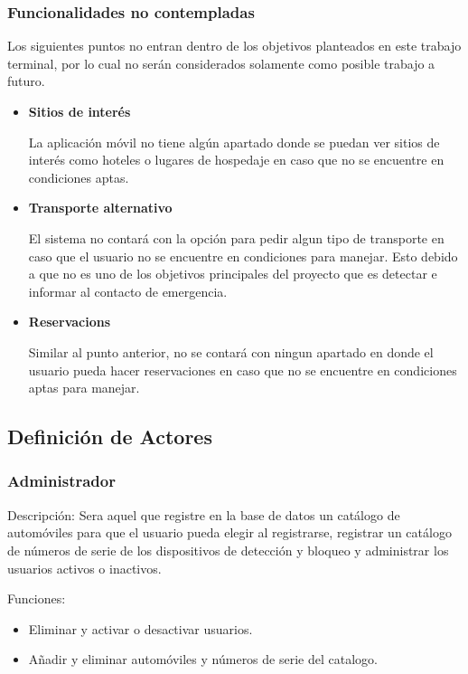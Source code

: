 	\subsubsection{Funcionalidades no contempladas}
	Los siguientes puntos no entran dentro de los objetivos planteados en este trabajo terminal, por lo cual no serán considerados solamente como posible trabajo a futuro.
		\begin{itemize}
			\item {\textbf{Sitios de interés} \par La aplicación móvil no tiene algún apartado donde se puedan ver sitios de interés como hoteles o lugares de hospedaje en caso que no se encuentre en condiciones aptas.}
			\item {\textbf{Transporte alternativo} \par El sistema no contará con la opción para pedir algun tipo de transporte en caso que el usuario no se encuentre en condiciones para manejar. Esto debido a que no es uno de los objetivos principales del proyecto que es detectar e informar al contacto de emergencia.}
			\item {\textbf{Reservacions} \par Similar al punto anterior, no se contará con ningun apartado en donde el usuario pueda hacer reservaciones en caso que no se encuentre en condiciones aptas para manejar.}
		\end{itemize}
\subsection{Definición de Actores}
	\subsubsection{Administrador}
	Descripción: Sera aquel que registre en la base de datos un catálogo de automóviles para que el usuario pueda elegir al registrarse, registrar un catálogo de números de serie de los dispositivos de detección y bloqueo y administrar los usuarios activos o inactivos. \par
	Funciones:
	\begin{itemize}
		\item Eliminar y activar o desactivar usuarios.
		\item Añadir y eliminar automóviles y números de serie del catalogo.
	\end{itemize}
